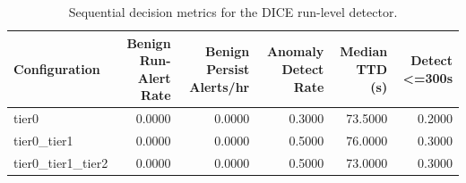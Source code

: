 \begin{table}[t]
\centering
\caption{Sequential decision metrics for the DICE run-level detector.}
\label{tab:dice_sequential_metrics}
\footnotesize
\begin{tabular}{lrrrrr}
\toprule
Configuration & Benign Run-Alert Rate & Benign Persist Alerts/hr & Anomaly Detect Rate & Median TTD (s) & Detect <=300s \\
\midrule
tier0 & 0.0000 & 0.0000 & 0.3000 & 73.5000 & 0.2000 \\
tier0_tier1 & 0.0000 & 0.0000 & 0.5000 & 76.0000 & 0.3000 \\
tier0_tier1_tier2 & 0.0000 & 0.0000 & 0.5000 & 73.0000 & 0.3000 \\
\bottomrule
\end{tabular}

\end{table}
